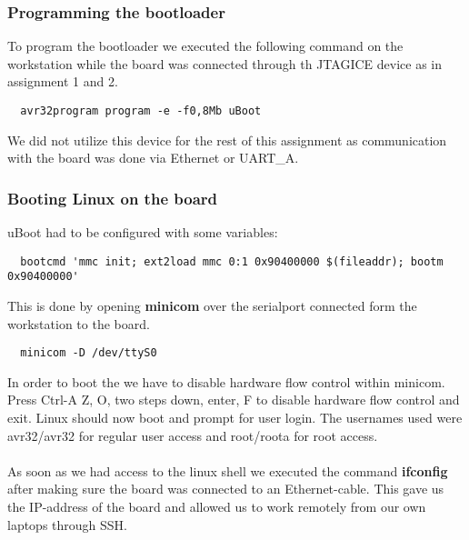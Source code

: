 \subsubsection{Programming the bootloader}
To program the bootloader we executed the following command on the workstation while the
board was connected through th JTAGICE device as in assignment 1 and 2.
\begin{verbatim}
  avr32program program -e -f0,8Mb uBoot
\end{verbatim}
We did not utilize this device for the rest of this assignment as communication with the board
was done via Ethernet or UART\_A.

\subsubsection{Booting Linux on the board}
uBoot had to be configured with some variables:
\begin{verbatim}
  bootcmd 'mmc init; ext2load mmc 0:1 0x90400000 $(fileaddr); bootm 0x90400000'
\end{verbatim}
This is done by opening {\bf minicom} over the serialport connected form the workstation to the board.
\begin{verbatim}
  minicom -D /dev/ttyS0
\end{verbatim}
In order to boot the we have to disable hardware flow control within minicom.
Press Ctrl-A Z, O, two steps down, enter, F to disable hardware flow control and exit.
Linux should now boot and prompt for user login. The usernames used were avr32/avr32 for
regular user access and root/roota for root access.\\
\\
As soon as we had access to the linux shell we executed the command {\bf ifconfig} after
making sure the board was connected to an Ethernet-cable. This gave us the IP-address of the
board and allowed us to work remotely from our own laptops through SSH.

